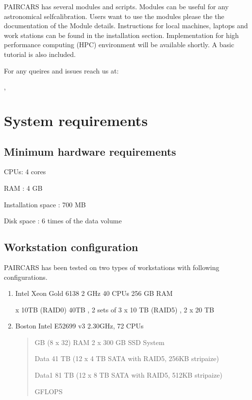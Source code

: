 \documentclass[letterpaper,10pt,english]{sphinxmanual}
\begin{document}
\sphinxAtStartPar
P\sphinxhyphen{}AIRCARS has several modules and scripts. Modules can be useful for any astronomical self\sphinxhyphen{}calibration. Users want to use the modules please the the documentation of the Module details.
Instructions for local machines, laptops and work stations can be found in the installation section. Implementation for high performance computing (HPC) environment will be available shortly. A basic tutorial is also included.

\sphinxAtStartPar
For any queires and issues reach us at:

\sphinxAtStartPar
{}, 


\section{System requirements}
\label{\detokenize{intro:system-requirements}}

\subsection{Minimum hardware requirements}
\label{\detokenize{intro:minimum-hardware-requirements}}
\sphinxAtStartPar
CPUs: 4 cores

\sphinxAtStartPar
RAM : 4 GB

\sphinxAtStartPar
Installation space : 700 MB

\sphinxAtStartPar
Disk space : 6 times of the data volume


\subsection{Workstation configuration}
\label{\detokenize{intro:workstation-configuration}}
\sphinxAtStartPar
P\sphinxhyphen{}AIRCARS has been tested on two types of workstations with following configurations.
\begin{enumerate}
%
\item {} 
\sphinxAtStartPar
Intel Xeon Gold 6138 2 GHz 40 CPUs \sphinxhyphen{} 256 GB RAM

 x 10TB (RAID\sphinxhyphen{}0) 40TB , 2 sets of 3 x 10 TB (RAID\sphinxhyphen{}5) , 2 x 20 TB

\item {} 
\sphinxAtStartPar
Boston Intel E5\sphinxhyphen{}2699 v3 2.30GHz, 72 CPUs
\begin{quote}

 GB (8 x 32) RAM \sphinxhyphen{} 2 x 300 GB SSD System

\sphinxAtStartPar
Data 41 TB (12 x 4 TB SATA with RAID\sphinxhyphen{}5, 256KB stripaize)

\sphinxAtStartPar
Data1 81 TB (12 x 8 TB SATA with RAID\sphinxhyphen{}5, 512KB stripaize)

 GFLOPS
\end{quote}

\end{enumerate}
\end{document}
